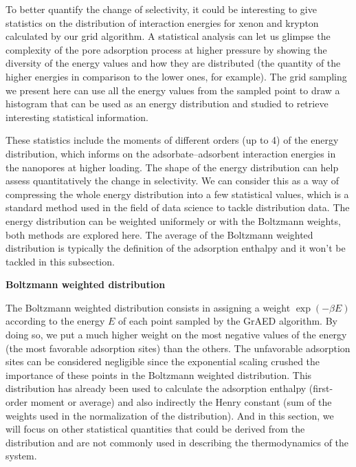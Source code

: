 \documentclass[main]{subfiles}
\begin{document}
To better quantify the change of selectivity, it could be interesting to give statistics on the distribution of interaction energies for xenon and krypton calculated by our grid algorithm. A statistical analysis can let us glimpse the complexity of the pore adsorption process at higher pressure by showing the diversity of the energy values and how they are distributed (the quantity of the higher energies in comparison to the lower ones, for example). The grid sampling we present here can use all the energy values from the sampled point to draw a histogram that can be used as an energy distribution and studied to retrieve interesting statistical information.

These statistics include the moments of different orders (up to 4) of the energy distribution, which informs on the adsorbate--adsorbent interaction energies in the nanopores at higher loading. The shape of the energy distribution can help assess quantitatively the change in selectivity. We can consider this as a way of compressing the whole energy distribution into a few statistical values, which is a standard method used in the field of data science to tackle distribution data. The energy distribution can be weighted uniformely or with the Boltzmann weights, both methods are explored here. The average of the Boltzmann weighted distribution is typically the definition of the adsorption enthalpy and it won't be tackled in this subsection.

\textbf{Boltzmann weighted distribution}

The Boltzmann weighted distribution consists in assigning a weight $\exp(-\beta E)$ according to the energy $E$ of each point sampled by the GrAED algorithm. By doing so, we put a much higher weight on the most negative values of the energy (the most favorable adsorption sites) than the others. The unfavorable adsorption sites can be considered negligible since the exponential scaling crushed the importance of these points in the Boltzmann weighted distribution. This distribution has already been used to calculate the adsorption enthalpy (first-order moment or average) and also indirectly the Henry constant (sum of the weights used in the normalization of the distribution). And in this section, we will focus on other statistical quantities that could be derived from the distribution and are not commonly used in describing the thermodynamics of the system.
\end{document}
